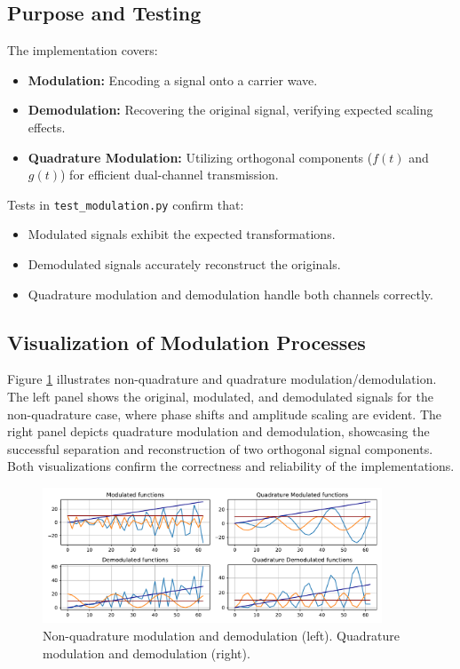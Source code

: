 \documentclass[12pt, a4paper]{report}
\begin{document}
\subsection{Purpose and Testing}
The implementation covers:
\begin{itemize}
	\item \textbf{Modulation:} Encoding a signal onto a carrier wave.
	\item \textbf{Demodulation:} Recovering the original signal, verifying expected scaling effects.
	\item \textbf{Quadrature Modulation:} Utilizing orthogonal components (\(f(t)\) and \(g(t)\)) for efficient dual-channel transmission.
\end{itemize}

Tests in \texttt{test\_modulation.py} confirm that:
\begin{itemize}
	\item Modulated signals exhibit the expected transformations.
	\item Demodulated signals accurately reconstruct the originals.
	\item Quadrature modulation and demodulation handle both channels correctly.
\end{itemize}

\subsection{Visualization of Modulation Processes}
Figure \ref{fig:modulation_visualizations} illustrates non-quadrature and quadrature modulation/demodulation.
The left panel shows the original, modulated, and demodulated signals for the non-quadrature case,
where phase shifts and amplitude scaling are evident.
The right panel depicts quadrature modulation and demodulation,
showcasing the successful separation and reconstruction of two orthogonal signal components.
Both visualizations confirm the correctness and reliability of the implementations.

\begin{figure}[h!]
	\centering
	\includegraphics[width=0.9\textwidth]{figures/modulation.pdf}
	\caption{Non-quadrature modulation and demodulation (left). Quadrature modulation and demodulation (right).}
	\label{fig:modulation_visualizations}
\end{figure}
\end{document}
